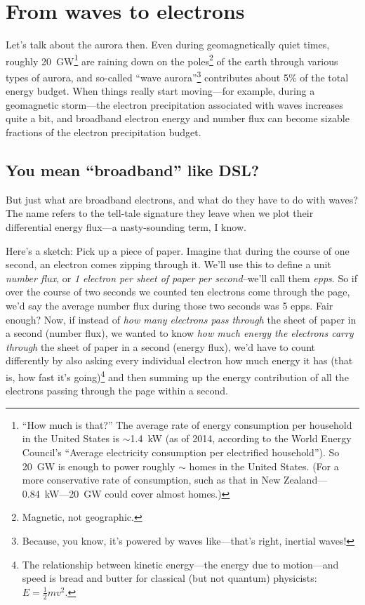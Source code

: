 \section{From waves to electrons}

Let's talk about the aurora then. Even during geomagnetically quiet times,
roughly 20~GW\footnote{``How much is that?'' The average rate of energy
  consumption per household in the United States is $\sim$1.4~kW (as of 2014,
  according to the World Energy Council's ``Average electricity consumption per
  electrified household''). So 20~GW is enough to power roughly
  $\sim$ homes in the United States. (For a more conservative
  rate of consumption, such as that in New Zealand---0.84~kW---20~GW could cover
  almost  homes.)} \citep{Newell2009} are raining down on the
poles\footnote{Magnetic, not geographic.} of the earth through various types of
aurora, and so-called ``wave aurora''\footnote{Because, you know, it's powered
  by waves like---that's right, inertial \Alf waves!} contributes about 5\% of
the total energy budget. When things really start moving---for example, during a
geomagnetic storm---the electron precipitation associated with \Alf waves
increases quite a bit, and broadband electron energy and number flux can become
sizable fractions of the electron precipitation budget.

\subsection{You mean ``broadband'' like DSL?}

But just what are broadband electrons, and what do they have to do
with \Alf waves? The name refers to the tell-tale signature they leave
when we plot their differential energy flux---a nasty-sounding term, I
know.

Here's a sketch: Pick up a piece of paper. Imagine that during the
course of one second, an electron comes zipping through it. We'll use
this to define a unit \emph{number flux}, or \emph {1 electron per
  sheet of paper per second}--we'll call them \emph{epps}. So if over
the course of two seconds we counted ten electrons come through the
page, we'd say the average number flux during those two seconds was 5
epps. Fair enough?  Now, if instead of \emph{how many electrons pass
  through} the sheet of paper in a second (number flux), we wanted to
know \emph{how much energy the electrons carry through} the sheet of
paper in a second (energy flux), we'd have to count differently by
also asking every individual electron how much energy it has (that is,
how fast it's going)\footnote{The relationship between kinetic
  energy---the energy due to motion---and speed is bread and butter
  for classical (but not quantum) physicists: $E = \frac{1}{2}m v^2.$}
and then summing up the energy contribution of all the electrons
passing through the page within a second.

